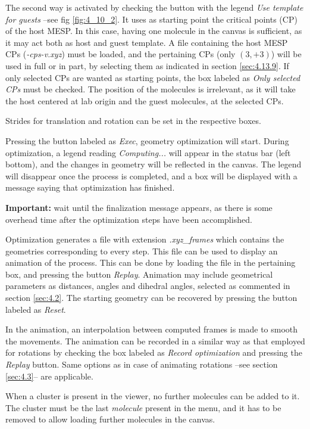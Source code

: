 \documentclass[10pt]{article}
\begin{document}
The second way is activated by checking the button with the legend
{\it Use template for guests} --see fig \ref{fig:4_10_2}. It
uses as starting point the critical points (CP) of the host MESP.
In this case, having one molecule in the canvas is sufficient, as it
may act both as host and guest template. A file containing the host 
MESP CPs ({\it *-cps-v.xyz})
must be loaded, and the pertaining CPs (only $(3,+3)$)
will be used in full or in part, by selecting them as indicated
in section \ref{sec:4.13.9}. If only selected CPs are wanted as starting 
points, the box labeled as {\it Only selected CPs} must be checked.
The position of the molecules is irrelevant, as it will take
the host centered at lab origin and the guest molecules, at the 
selected CPs.

Strides for translation and rotation can be set in the respective 
boxes.

Pressing the button labeled as {\it Exec}, geometry optimization will 
start. During optimization, 
a legend reading {\it Computing...} will appear in the status bar (left bottom),
and the changes in geometry will be reflected in the canvas.
The legend will disappear once the process is completed, and a box
will be displayed with a message saying that optimization has finished.

{\bf Important:} wait until the finalization message appears, as
there is some overhead time after the optimization steps have been 
accomplished.

Optimization generates a file with extension
{\it .xyz\_frames} which contains the geometries corresponding to 
every step. This file can be used to display an animation of the
process. This can be done by loading the file in the pertaining box,
and pressing the button {\it Replay}. Animation may include geometrical  
parameters as distances, angles and dihedral angles, selected as
commented in section \ref{sec:4.2}. 
The starting geometry can be recovered by pressing the button labeled
as {\it Reset}.

In the animation, an interpolation between computed frames is made to smooth
the movements. 
The animation can be recorded 
in a similar way as that employed for rotations
by checking the box labeled as
{\it Record optimization} and pressing the {\it Replay} button. Same options 
as in case of animating rotations --see section \ref{sec:4.3}-- are applicable.

When a cluster is present in the viewer, no further molecules can be added to it.
The cluster must be the last {\it molecule} present in the menu, and it has to be 
removed to allow loading further molecules in the canvas.
\end{document}
